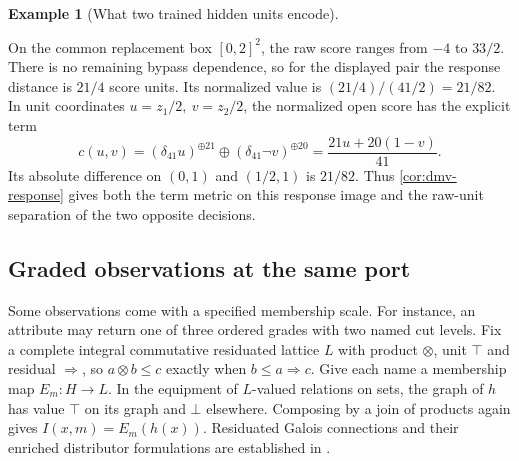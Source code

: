 \documentclass[11pt,a4paper]{article}
\theoremstyle{definition}
\newtheorem{example}[example]{Example}
\theoremstyle{remark}\newaliascnt{remark}{theorem}
\numberwithin{equation}{section}
\begin{document}
\begin{example}[What two trained hidden units encode]
\begin{enumerate}[titledsteps]
On the common replacement box \([0,2]^2\), the raw score ranges from \(-4\) to \(33/2\). There is no remaining bypass dependence, so for the displayed pair the response distance is \(21/4\) score units. Its normalized value is \((21/4)/(41/2)=21/82\). In unit coordinates \(u=z_1/2,\ v=z_2/2\), the normalized open score has the explicit term
\[
 c(u,v)=(\delta_{41}u)^{\oplus21}\oplus(\delta_{41}\neg v)^{\oplus20}
       =\frac{21u+20(1-v)}{41}.
\]
Its absolute difference on \((0,1)\) and \((1/2,1)\) is \(21/82\). Thus \cref{cor:dmv-response} gives both the term metric on this response image and the raw-unit separation of the two opposite decisions.
\end{enumerate}
\end{example}

\subsection{Graded observations at the same port}\label{sec:graded-concepts}
Some observations come with a specified membership scale. For instance, an attribute may return one of three ordered grades with two named cut levels. Fix a complete integral commutative residuated lattice $L$ with product $\otimes$, unit $\top$ and residual $\Rightarrow$, so $a\otimes b\le c$ exactly when $b\le a\Rightarrow c$. Give each name a membership map $E_m:H\to L$. In the equipment of $L$-valued relations on sets, the graph of $h$ has value $\top$ on its graph and $\bot$ elsewhere. Composing by a join of products again gives $I(x,m)=E_m(h(x))$. Residuated Galois connections and their enriched distributor formulations are established in \cite{fuzzy-galois,isbell-distributors,multi-concept-lattices}.
\end{document}
